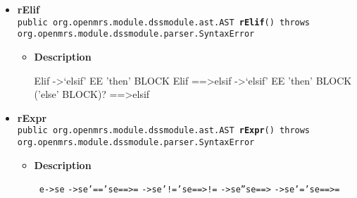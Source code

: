 {{{{{\begin{itemize}
{\begin{itemize}
{}
\item{{\bf  Returns} -- 
the tree corresponding to the expression 
}%
\item{{\bf  Throws}
}%
\end{itemize}
}%
\item{ 
\hypertarget{org.openmrs.module.dssmodule.parser.Parser.rElif()}{{\bf  rElif}\\}
\texttt{public org.openmrs.module.dssmodule.ast.AST\ {\bf  rElif}() throws org.openmrs.module.dssmodule.parser.SyntaxError
\label{org.openmrs.module.dssmodule.parser.Parser.rElif()}}%
\begin{itemize}
\item{
{\bf  Description}

Elif -\textgreater  ‘elsif’ EE 'then' BLOCK Elif ==\textgreater  elsif -\textgreater  ‘elsif’ EE 'then' BLOCK ('else' BLOCK)? ==\textgreater  elsif
}
\end{itemize}
}%
\item{ 
\hypertarget{org.openmrs.module.dssmodule.parser.Parser.rExpr()}{{\bf  rExpr}\\}
\texttt{public org.openmrs.module.dssmodule.ast.AST\ {\bf  rExpr}() throws org.openmrs.module.dssmodule.parser.SyntaxError
\label{org.openmrs.module.dssmodule.parser.Parser.rExpr()}}%
\begin{itemize}
\item{
{\bf  Description}

\texttt{\small
\mbox{}\newline \phantom{ }e\phantom{ }-\textgreater \phantom{ }se}\mbox{}\newline
\texttt{\small \phantom{ }-\textgreater \phantom{ }se\phantom{ }'=='\phantom{ }se\phantom{ }==\textgreater \phantom{ }=}\mbox{}\newline
\texttt{\small \phantom{ }-\textgreater \phantom{ }se\phantom{ }'!='\phantom{ }se\phantom{ }==\textgreater \phantom{ }!=}\mbox{}\newline
\texttt{\small \phantom{ }-\textgreater \phantom{ }se\phantom{ }''\phantom{ }se\phantom{ }==\textgreater \phantom{ }}\mbox{}\newline
\texttt{\small \phantom{ }-\textgreater \phantom{ }se\phantom{ }'='\phantom{ }se\phantom{ }==\textgreater \phantom{ }=}\mbox{}\newline
\texttt{\small \phantom{ }}

}
\end{itemize}}
\end{itemize}}}}}}
